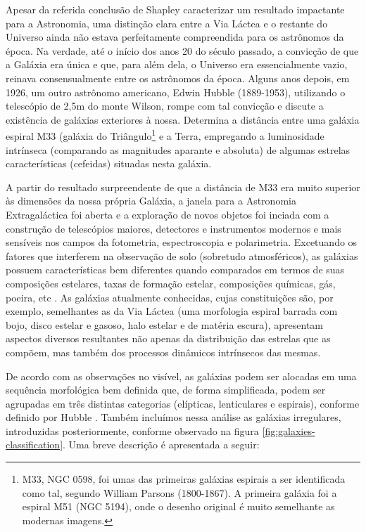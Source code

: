 Apesar da referida conclusão de Shapley caracterizar um resultado impactante para a Astronomia, uma distinção clara entre a Via Láctea e o restante do Universo ainda não estava perfeitamente compreendida para os astrônomos da época. Na verdade, até o início dos anos 20 do século passado, a convicção de que a Galáxia era única e que, para além dela, o Universo era essencialmente vazio, reinava consensualmente entre os astrônomos da época. Alguns anos depois, em 1926, um outro astrônomo americano, Edwin Hubble (1889-1953), utilizando o telescópio de 2,5m do monte Wilson, rompe com tal convicção e discute a existência de galáxias exteriores à nossa. Determina a distância entre uma galáxia espiral M33 (galáxia do Triângulo\footnote{M33, NGC 0598, foi umas das primeiras galáxias espirais a ser identificada como tal, segundo William Parsons (1800-1867). A primeira galáxia foi a espiral M51 (NGC 5194), onde o desenho original é muito semelhante as modernas imagens.} e a Terra, empregando a luminosidade intrínseca (comparando as magnitudes aparante e absoluta) de algumas estrelas características (cefeidas) situadas nesta galáxia.

A partir do resultado surpreendente de que a distância de M33 era muito superior às dimensões da nossa própria Galáxia, a janela para a Astronomia Extragaláctica foi aberta e a exploração de novos objetos foi inciada com a construção de telescópios maiores, detectores e instrumentos modernos e mais sensíveis nos campos da fotometria, espectroscopia e polarimetria. Excetuando os fatores que interferem na observação de solo (sobretudo atmosféricos), as galáxias possuem características bem diferentes quando comparados em termos de suas composições estelares, taxas de formação estelar, composições químicas, gás, poeira, etc \cite{kennicutt1998star}. As galáxias atualmente conhecidas, cujas constituições são, por exemplo, semelhantes as da Via Láctea (uma morfologia espiral barrada com bojo, disco estelar e gasoso, halo estelar e de matéria escura), apresentam aspectos diversos resultantes não apenas da distribuição das estrelas que as compõem, mas também dos processos dinâmicos intrínsecos das mesmas.

De acordo com as observações no visível, as galáxias podem ser alocadas em uma sequência morfológica bem definida que, de forma simplificada, podem ser agrupadas em três distintas categorias (elípticas, lenticulares e espirais), conforme definido por Hubble \cite{hubble1926ed}. Também incluímos nessa análise as galáxias irregulares, introduzidas posteriormente, conforme observado na figura \ref{fig:galaxies-classification}. Uma breve descrição é apresentada a seguir:

